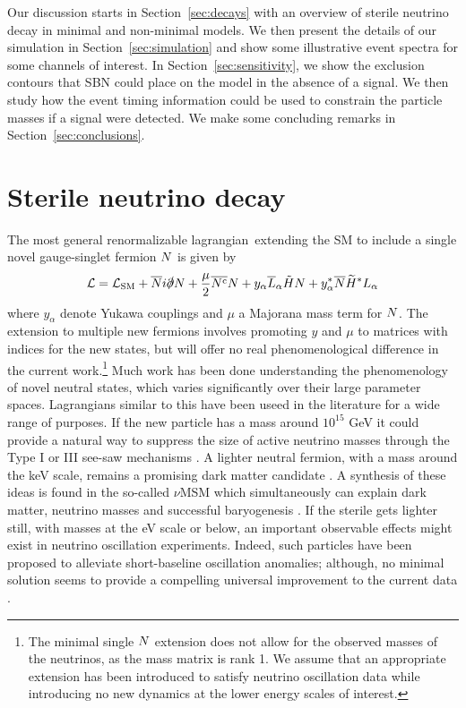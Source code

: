 \documentclass[11pt, a4paper]{article}
\newcommand{\refsec}[1]{Section~\ref{#1}}
\def\lagrangian{lagrangian}
\def\ster{\ensuremath N}
\begin{document}
Our discussion starts in \refsec{sec:decays} with an overview of sterile
neutrino decay in minimal and non-minimal models. We then present the details
of our simulation in \refsec{sec:simulation} and show some illustrative event
spectra for some channels of interest. In \refsec{sec:sensitivity}, we show the
exclusion contours that SBN could place on the model in the absence of a
signal. We then study how the event timing information could be used to
constrain the particle masses if a signal were detected. We make some
concluding remarks in \refsec{sec:conclusions}.

\section{\label{sec:decays}Sterile neutrino decay}

The most general renormalizable \lagrangian\ extending the SM to include a
single novel gauge-singlet fermion $\ster$ is given by
%
\begin{align}   \mathcal{L} = \mathcal{L}_\text{SM} +
\overline{\ster}i\slashed{\partial}\ster+ \frac{\mu}{2}
\overline{\ster^\text{c}}\ster  + y_\alpha\overline{L}_\alpha\tilde{H} \ster +
y_\alpha^* \overline{\ster}\widetilde{H}^*L_\alpha\label{eq:minimallag}
\end{align}
%
where $y_\alpha$ denote Yukawa couplings and $\mu$ a Majorana mass term for
$\ster$. The extension to multiple new fermions involves promoting $y$ and
$\mu$ to matrices with indices for the new states, but will offer no real
phenomenological difference in the current work.\footnote{The minimal single
$\ster$ extension does not allow for the observed masses of the neutrinos, as
the mass matrix is rank 1. We assume that an appropriate extension has been
introduced to satisfy neutrino oscillation data while introducing no new
dynamics at the lower energy scales of interest.} Much work has been done
understanding the phenomenology of novel neutral states, which varies
significantly over their large parameter spaces. 
%
Lagrangians similar to this have been useed in the literature for a wide range
of purposes. If the new particle has a mass around $10^{15}$ GeV it could
provide a natural way to suppress the size of active neutrino masses through
the Type I or III see-saw mechanisms \cite{Minkowski:1977sc, GellMann:1980vs,
Mohapatra:1979ia}. A lighter neutral fermion, with a mass around the keV scale,
remains a promising dark matter candidate \cite{Adhikari:2016bei}. A synthesis
of these ideas is found in the so-called $\nu$MSM which simultaneously can
explain dark matter, neutrino masses and successful baryogenesis
\cite{Asaka:2005pn}. 
%
If the sterile gets lighter still, with masses at the eV scale or below, an
important observable effects might exist in neutrino oscillation experiments.
Indeed, such particles have been proposed to alleviate short-baseline
oscillation anomalies; although, no minimal solution seems to provide a
compelling universal improvement to the current data \cite{Kopp:2013vaa,Conrad:2012qt}.
\end{document}
